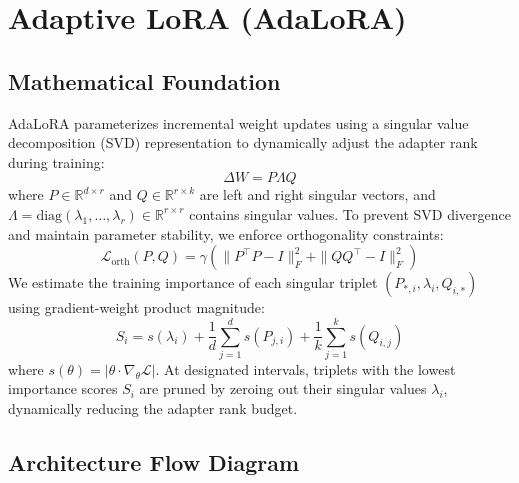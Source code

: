 \documentclass{article}
\begin{document}
\newpage
\section{Adaptive LoRA (AdaLoRA)}

\subsection{Mathematical Foundation}
AdaLoRA parameterizes incremental weight updates using a singular value decomposition (SVD) representation to dynamically adjust the adapter rank during training:
\begin{equation}
  \Delta W = P \Lambda Q
\end{equation}
where $P \in \mathbb{R}^{d \times r}$ and $Q \in \mathbb{R}^{r \times k}$ are left and right singular vectors, and $\Lambda = \text{diag}(\lambda_1, \dots, \lambda_r) \in \mathbb{R}^{r \times r}$ contains singular values.
To prevent SVD divergence and maintain parameter stability, we enforce orthogonality constraints:
\begin{equation}
  \mathcal{L}_{\text{orth}}(P, Q) = \gamma \left( \|P^\top P - I\|_F^2 + \|Q Q^\top - I\|_F^2 \right)
\end{equation}
We estimate the training importance of each singular triplet $(P_{*,i}, \lambda_i, Q_{i,*})$ using gradient-weight product magnitude:
\begin{equation}
  S_i = s(\lambda_i) + \frac{1}{d} \sum_{j=1}^d s(P_{j,i}) + \frac{1}{k} \sum_{j=1}^k s(Q_{i,j})
\end{equation}
where $s(\theta) = |\theta \cdot \nabla_\theta \mathcal{L}|$. At designated intervals, triplets with the lowest importance scores $S_i$ are pruned by zeroing out their singular values $\lambda_i$, dynamically reducing the adapter rank budget.

\subsection{Architecture Flow Diagram}
\end{document}
